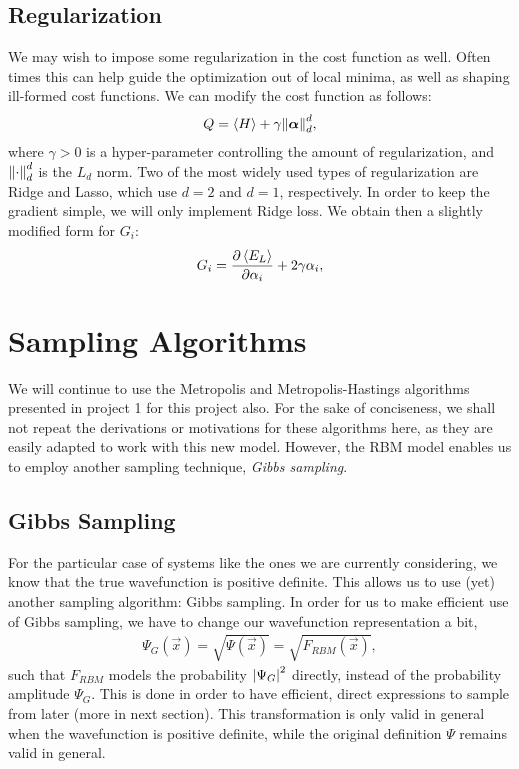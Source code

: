 \documentclass[a4paper, 11pt]{article}
\begin{document}
\begin{multicols}{2}
    \subsection{Regularization}

    We may wish to impose some regularization in the cost function as well.
    Often times this can help guide the optimization out of local minima, as
    well as shaping ill-formed cost functions. We can modify the cost function
    as follows:
    \begin{align}
        Q = \expval{H} + \gamma\norm{\bm \alpha}_d^d,
    \end{align} 
    where $\gamma>0$ is a hyper-parameter controlling the amount of
    regularization, and $\norm{\cdot}_d^d$ is the $L_d$ norm. Two of the most widely used
    types of regularization are Ridge and Lasso, which use $d=2$ and $d=1$,
    respectively. In order to keep the gradient simple, we will only implement
    Ridge loss. We obtain then a slightly modified form for $G_i$:
    \begin{align}
        G_i = \pdv{\expval{E_L}}{\alpha_i} +
        2\gamma\alpha_i,\label{eq:G-i-ridge}
    \end{align}

    \section{Sampling Algorithms}

    We will continue to use the Metropolis and Metropolis-Hastings algorithms
    presented in project 1 for this project also. For the sake of conciseness,
    we shall not repeat the derivations or motivations for these algorithms
    here, as they are easily adapted to work with this new model. However, the
    RBM model enables us to employ another sampling technique, \emph{Gibbs
    sampling}.

    \subsection{Gibbs Sampling}

    For the particular case of systems like the ones we are currently
    considering, we know that the true wavefunction is positive definite. This
    allows us to use (yet) another sampling algorithm: Gibbs sampling. In order
    for us to make efficient use of Gibbs sampling, we have to change our
    wavefunction representation a bit,
    \begin{align}
        \Psi_G(\vec x) = \sqrt{\Psi(\vec x)} = \sqrt{F_{RBM}(\vec
        x)}\label{eq:Psi-gibbs-def},
    \end{align}
    such that $F_{RBM}$ models the probability $\abs{\Psi_G}^2$ directly, instead
    of the probability amplitude $\Psi_G$. This is done in order to have
    efficient, direct expressions to sample from later (more in next section).
    This transformation is only valid in
    general when the wavefunction is positive definite, while the original
    definition $\Psi$ remains valid in general. 


\end{multicols}
\end{document}
